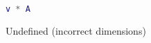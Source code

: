 \begin{lstlisting}[language=Matlab]
v * A
\end{lstlisting}

\begin{solution}
Undefined (incorrect dimensions)
\end{solution}
